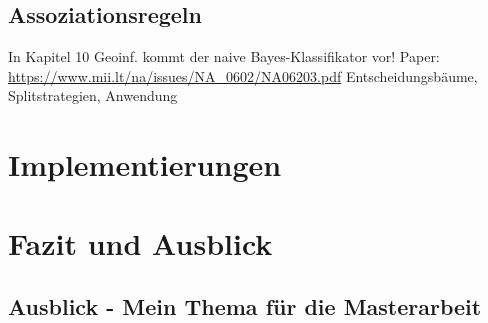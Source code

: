 \documentclass[11pt,ceqn]{book}
\begin{document}
\section{Assoziationsregeln}
In Kapitel 10 Geoinf. kommt der naive Bayes-Klassifikator vor!
Paper: \url{https://www.mii.lt/na/issues/NA_0602/NA06203.pdf}
Entscheidungsbäume, Splitstrategien, Anwendung

\chapter{Implementierungen}


\chapter{Fazit und Ausblick}
\section{Ausblick - Mein Thema für die Masterarbeit}


\printbibliography
\vfill
\end{document}
